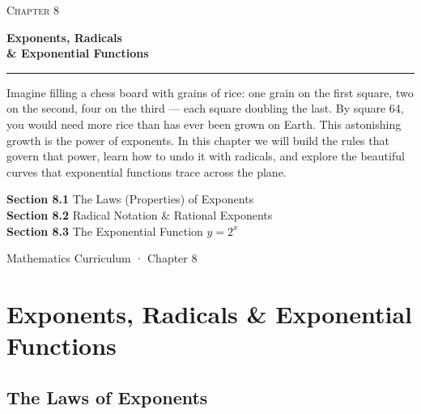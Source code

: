 \documentclass[12pt, letterpaper]{book}
\begin{document}

\begin{titlepage}
  \centering
  \vspace*{3cm}
  {\small\scshape\color{AccentRed} Chapter 8}\par
  \vspace{0.5cm}
  {\Huge\bfseries Exponents, Radicals\\[6pt] \& Exponential Functions}\par
  \vspace{0.4cm}
  {\large\color{Gold}\rule{6cm}{1.5pt}}\par
  \vspace{1.2cm}
  \begin{storybox}
    Imagine filling a chess board with grains of rice: one grain on the first square,
    two on the second, four on the third --- each square doubling the last.
    By square 64, you would need more rice than has ever been grown on Earth.
    This astonishing growth is the power of exponents. In this chapter we will
    build the rules that govern that power, learn how to undo it with radicals,
    and explore the beautiful curves that exponential functions trace across the plane.
  \end{storybox}
  \vspace{1.2cm}
  \begin{flushleft}
    \large
    \textbf{Section 8.1} \quad The Laws (Properties) of Exponents\\[4pt]
    \textbf{Section 8.2} \quad Radical Notation \& Rational Exponents\\[4pt]
    \textbf{Section 8.3} \quad The Exponential Function $y = 2^x$
  \end{flushleft}
  \vfill
  {\small\color{gray} Mathematics Curriculum · Chapter 8}
\end{titlepage}

\tableofcontents
\newpage

\chapter{Exponents, Radicals \& Exponential Functions}

\section{The Laws of Exponents}
\end{document}

